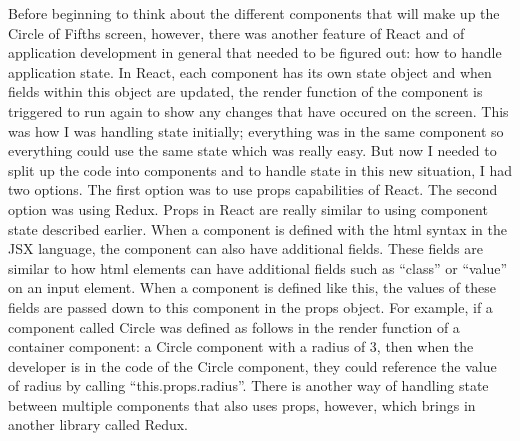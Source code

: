 \documentclass[onecolumn, draftclsnofoot,10pt, compsoc]{IEEEtran}
\begin{document}
Before beginning to think about the different components that will make up the Circle of Fifths screen, however, there was another feature of React and of application development in general that needed to be figured out: how to handle application state. 
In React, each component has its own state object and when fields within this object are updated, the render function of the component is triggered to run again to show any changes that have occured on the screen. 
This was how I was handling state initially; everything was in the same component so everything could use the same state which was really easy. 
But now I needed to split up the code into components and to handle state in this new situation, I had two options. 
The first option was to use props capabilities of React. 
The second option was using Redux. Props in React are really similar to using component state described earlier. 
When a component is defined with the html syntax in the JSX language, the component can also have additional fields. 
These fields are similar to how html elements can have additional fields such as “class” or “value” on an input element. 
When a component is defined like this, the values of these fields are passed down to this component in the props object. 
For example, if a component called Circle was defined as follows in the render function of a container component: a Circle component with a radius of 3, then when the developer is in the code of the Circle component, they could reference the value of radius by calling ``this.props.radius''. 
There is another way of handling state between multiple components that also uses props, however, which brings in another library called Redux.
\end{document}
